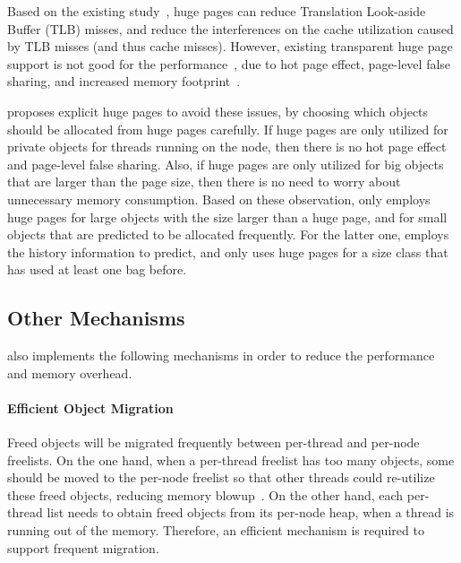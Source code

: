  Based on the existing study~\cite{hugepages}, huge pages can reduce Translation Look-aside Buffer (TLB) misses, and reduce the interferences on the cache utilization caused by TLB misses (and thus cache misses). However, existing  transparent huge page support is not good for the performance~\cite{Gaud:2014:LPM:2643634.2643659, DBLP:conf/asplos/PanwarBG19}, due to hot page effect, page-level false sharing, and increased memory footprint~\cite{DBLP:conf/asplos/MaasAIJMR20}.
 
\NA{} proposes explicit huge pages to avoid these issues, by choosing which objects should be allocated from huge pages carefully. If huge pages are only utilized for private objects for threads running on the node, then there is no hot page effect and page-level false sharing. Also, if huge pages are only utilized for big objects that are larger than the page size, then there is no need to worry about unnecessary memory consumption. Based on these observation,  \NM{} only employs huge pages for large objects with the size larger than a huge page, and for small objects that are predicted to be allocated frequently. For the latter one, \NM{} employs the history information to predict, and only uses huge pages for a size class that has used at least one bag before. 


\subsection{Other Mechanisms}
\label{sec: others}

\NM{} also implements the following mechanisms in order to reduce the performance and memory overhead. 

\paragraph{Efficient Object Migration} Freed objects will be migrated frequently between per-thread and per-node freelists. On the one hand, when a per-thread freelist has too many objects, some should be moved to the per-node freelist so that other threads could re-utilize these freed objects, reducing memory blowup~\cite{Hoard}. On the other hand, each per-thread list needs to obtain freed objects from its per-node heap, when a thread is running out of the memory. Therefore, an efficient mechanism is required to support frequent migration. 

